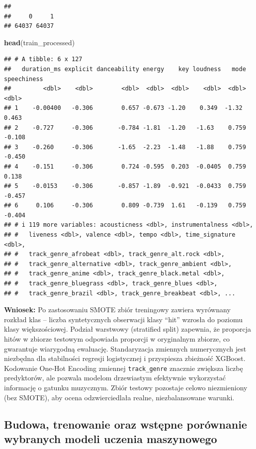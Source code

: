 \documentclass[
]{article}
\newenvironment{Shaded}{\begin{snugshade}}{\end{snugshade}}
\newcommand{\FunctionTok}[1]{\textcolor[rgb]{0.13,0.29,0.53}{\textbf{#1}}}
\newcommand{\NormalTok}[1]{#1}
\begin{document}
\begin{verbatim}
## 
##     0     1 
## 64037 64037
\end{verbatim}

\begin{Shaded}
\begin{Highlighting}[]
\FunctionTok{head}\NormalTok{(train\_processed)}
\end{Highlighting}
\end{Shaded}

\begin{verbatim}
## # A tibble: 6 x 127
##   duration_ms explicit danceability energy    key loudness   mode speechiness
##         <dbl>    <dbl>        <dbl>  <dbl>  <dbl>    <dbl>  <dbl>       <dbl>
## 1    -0.00400   -0.306        0.657 -0.673 -1.20    0.349  -1.32        0.463
## 2    -0.727     -0.306       -0.784 -1.81  -1.20   -1.63    0.759      -0.108
## 3    -0.260     -0.306       -1.65  -2.23  -1.48   -1.88    0.759      -0.450
## 4    -0.151     -0.306        0.724 -0.595  0.203  -0.0405  0.759       0.138
## 5    -0.0153    -0.306       -0.857 -1.89  -0.921  -0.0433  0.759      -0.457
## 6     0.106     -0.306        0.809 -0.739  1.61   -0.139   0.759      -0.404
## # i 119 more variables: acousticness <dbl>, instrumentalness <dbl>,
## #   liveness <dbl>, valence <dbl>, tempo <dbl>, time_signature <dbl>,
## #   track_genre_afrobeat <dbl>, track_genre_alt.rock <dbl>,
## #   track_genre_alternative <dbl>, track_genre_ambient <dbl>,
## #   track_genre_anime <dbl>, track_genre_black.metal <dbl>,
## #   track_genre_bluegrass <dbl>, track_genre_blues <dbl>,
## #   track_genre_brazil <dbl>, track_genre_breakbeat <dbl>, ...
\end{verbatim}

\textbf{Wniosek:} Po zastosowaniu SMOTE zbiór treningowy zawiera
wyrównany rozkład klas -- liczba syntetycznych obserwacji klasy ``hit''
wzrosła do poziomu klasy większościowej. Podział warstwowy (stratified
split) zapewnia, że proporcja hitów w zbiorze testowym odpowiada
proporcji w oryginalnym zbiorze, co gwarantuje wiarygodną ewaluację.
Standaryzacja zmiennych numerycznych jest niezbędna dla stabilności
regresji logistycznej i przyspiesza zbieżność XGBoost. Kodowanie One-Hot
Encoding zmiennej \texttt{track\_genre} znacznie zwiększa liczbę
predyktorów, ale pozwala modelom drzewiastym efektywnie wykorzystać
informację o gatunku muzycznym. Zbiór testowy pozostaje celowo
niezmieniony (bez SMOTE), aby ocena odzwierciedlała realne,
niezbalansowane warunki.

\subsection{Budowa, trenowanie oraz wstępne porównanie wybranych modeli
uczenia
maszynowego}\label{budowa-trenowanie-oraz-wstux119pne-poruxf3wnanie-wybranych-modeli-uczenia-maszynowego}
\end{document}
